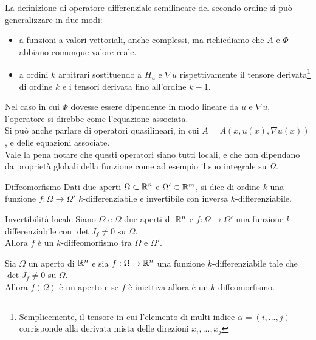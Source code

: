 \documentclass{article}
\begin{document}
\begin{remark}{}{}
    La definizione di \href{def:ODS2}{operatore differenziale semilineare del secondo ordine} si può generalizzare in due modi:\begin{itemize}
        \item a funzioni a valori vettoriali, anche complessi, ma richiediamo che $A$ e $\Phi$ abbiano comunque valore reale.
        \item a ordini $k$ arbitrari sostituendo a $H_u$ e $\nabla u$  rispettivamente il tensore derivata\footnote{Semplicemente, il tensore in cui l'elemento di multi-indice $\alpha = (i,...,j)$ corrisponde alla derivata mista delle direzioni $x_i,...,x_j$} di ordine $k$ e i tensori derivata fino all'ordine $k-1$.
    \end{itemize}
    Nel caso in cui $\Phi$ dovesse essere dipendente in modo lineare da $u$ e $\nabla u$, l'operatore si direbbe  come l'equazione associata.\\
    Si può anche parlare di operatori quasilineari, in cui $A = A(x,u(x),\nabla u(x))$, e delle equazioni associate.\\
    Vale la pena notare che questi operatori siano tutti locali, e che non dipendano da proprietà globali della funzione come ad esempio il suo integrale su $\Omega$.
\end{remark}

\begin{definition}{Diffeomorfismo}{}
    Dati due aperti $\Omega\subset \mathbb{R}^n$ e $\Omega'\subset \mathbb{R}^m$, si dice  di ordine $k$ una funzione $f:\Omega \to \Omega'$ $k$-differenziabile e invertibile con inversa $k$-differenziabile.
\end{definition}

\begin{theorem}{Invertibilità locale}{}
    Siano $\Omega$ e $\Omega$ due aperti di $\mathbb{R}^n$ e $f:\Omega\to\Omega'$ una funzione $k$-differenziabile con $\det J_f \neq 0$ su $\Omega$.\\
    Allora $f$ è un $k$-diffeomorfismo tra $\Omega$ e $\Omega'$.
\end{theorem}

\begin{corollary}{}{}
    Sia $\Omega$ un aperto di $\mathbb{R}^n$ e sia $f:\Omega\to\mathbb{R}^n$ una funzione $k$-differenziabile tale che $\det J_f \neq 0$ su $\Omega$.\\
    Allora $f(\Omega)$ è un aperto e se $f$ è iniettiva allora è un $k$-diffeomorfismo.
\end{corollary}
\end{document}
